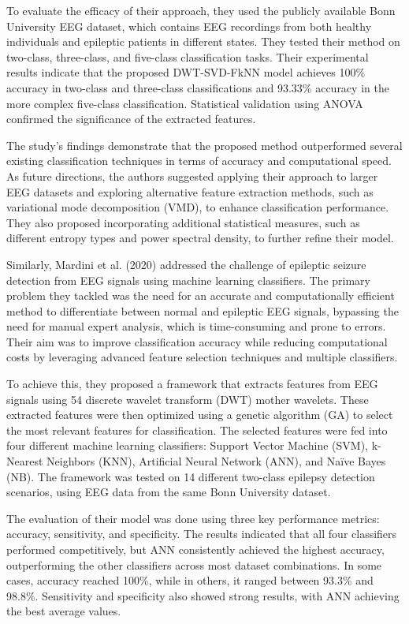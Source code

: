 \documentclass{article}
\begin{document}
To evaluate the efficacy of their approach, they used the publicly available Bonn University EEG dataset, which contains EEG recordings from both healthy individuals and epileptic patients in different states. They tested their method on two-class, three-class, and five-class classification tasks. Their experimental results indicate that the proposed DWT-SVD-FkNN model achieves 100\% accuracy in two-class and three-class classifications and 93.33\% accuracy in the more complex five-class classification. Statistical validation using ANOVA confirmed the significance of the extracted features.

The study's findings demonstrate that the proposed method outperformed several existing classification techniques in terms of accuracy and computational speed. As future directions, the authors suggested applying their approach to larger EEG datasets and exploring alternative feature extraction methods, such as variational mode decomposition (VMD), to enhance classification performance. They also proposed incorporating additional statistical measures, such as different entropy types and power spectral density, to further refine their model.

Similarly, Mardini et al. (2020) \cite{mardini2020} addressed the challenge of epileptic seizure detection from EEG signals using machine learning classifiers. The primary problem they tackled was the need for an accurate and computationally efficient method to differentiate between normal and epileptic EEG signals, bypassing the need for manual expert analysis, which is time-consuming and prone to errors. Their aim was to improve classification accuracy while reducing computational costs by leveraging advanced feature selection techniques and multiple classifiers.

To achieve this, they proposed a framework that extracts features from EEG signals using 54 discrete wavelet transform (DWT) mother wavelets. These extracted features were then optimized using a genetic algorithm (GA) to select the most relevant features for classification. The selected features were fed into four different machine learning classifiers: Support Vector Machine (SVM), k-Nearest Neighbors (KNN), Artificial Neural Network (ANN), and Naïve Bayes (NB). The framework was tested on 14 different two-class epilepsy detection scenarios, using EEG data from the same Bonn University dataset.

The evaluation of their model was done using three key performance metrics: accuracy, sensitivity, and specificity. The results indicated that all four classifiers performed competitively, but ANN consistently achieved the highest accuracy, outperforming the other classifiers across most dataset combinations. In some cases, accuracy reached 100\%, while in others, it ranged between 93.3\% and 98.8\%. Sensitivity and specificity also showed strong results, with ANN achieving the best average values.
\end{document}

